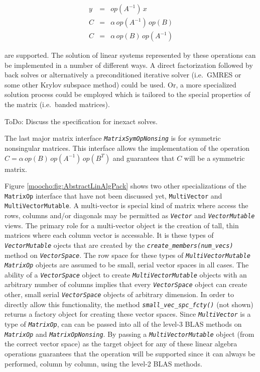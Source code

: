\documentclass[pdf,ps2pdf,11pt]{SANDreport}
\begin{document}
{\bsinglespace
\begin{eqnarray*}
y & = & op(A^{-1}) \, x \\
C & = & \alpha \, op(A^{-1}) \, op(B) \\
C & = & \alpha \, op(B) \, op(A^{-1})
\end{eqnarray*}
\esinglespace}

are supported.  The solution of linear systems represented by these
operations can be implemented in a number of different ways.  A direct
factorization followed by back solves or alternatively a
preconditioned iterative solver (i.e.\ GMRES or some other Krylov
subspace method) could be used.  Or, a more specialized solution
process could be employed which is tailored to the special properties
of the matrix (i.e.\ banded matrices).

ToDo: Discuss the specification for inexact solves.

The last major matrix interface
{}\texttt{\textit{Matrix\-Sym\-Op\-Nonsing}} is for symmetric
nonsingular matrices.  This interface allows the implementation of the
operation $C = \alpha\,op(B)\,op(A^{-1})\,op(B^T)$ and guarantees
that $C$ will be a symmetric matrix.

Figure {}\ref{moocho:fig:AbstractLinAlgPack} shows two other specializations of
the {}\texttt{Matrix\-Op} interface that have not been discussed yet,
{}\texttt{Multi\-Vector} and {}\texttt{Multi\-Vector\-Mutable}.  A
multi-vector is special kind of matrix where access the rows, columns and/or
diagonals may be permitted as {}\texttt{\textit{Vector}} and
{}\texttt{\textit{Vector\-Mutable}} views.  The primary role for a
multi-vector object is the creation of tall, thin matrices where each column
vector is accessable.  It is these types of
{}\texttt{\textit{Vector\-Mutable}} ojects that are created by the
{}\texttt{\textit{create\_members(num\_vecs)}} method on
{}\texttt{\textit{Vector\-Space}}.  The row space for these types of
{}\texttt{\textit{Multi\-Vector\-Mutable}} {}\texttt{\textit{Matrix\-Op}}
objects are assumed to be small, serial vector spaces in all cases.  The
ability of a {}\texttt{\textit{Vector\-Space}} object to create
{}\texttt{\textit{Multi\-Vector\-Mutable}} objects with an arbitrary number of
columns implies that every {}\texttt{\textit{Vector\-Space}} object can create
other, small serial {}\texttt{\textit{Vector\-Space}} objects of arbitrary
dimension.  In order to directly allow this functionality, the method
{}\texttt{\textit{small\_vec\_spc\_fcty()}} (not shown) returns a factory
object for creating these vector spaces.  Since
{}\texttt{\textit{Multi\-Vector}} is a type of {}\texttt{\textit{Matrix\-Op}},
can can be passed into all of the level-3 BLAS methods on
{}\texttt{\textit{Matrix\-Op}} and {}\texttt{\textit{Matrix\-Op\-Nonsing}}.
By passing a {}\texttt{\textit{Multi\-Vector\-Mutable}} object (from the
correct vector space) as the target object for any of these linear algebra
operations guarantees that the operation will be supported since it can always
be performed, column by column, using the level-2 BLAS methods.
\end{document}
